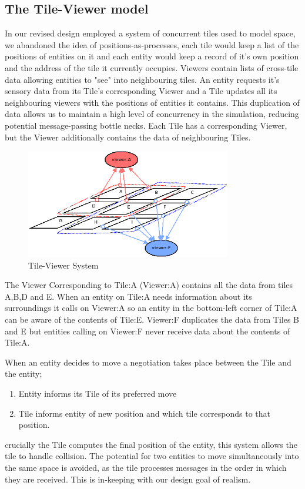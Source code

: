 \subsection{The Tile-Viewer model}
In our revised design employed a system of concurrent tiles used to model space, we abandoned the idea of positions-as-processes, each tile would keep a list of the positions of entities on it and each entity would keep a record of it's own position and the address of the tile it currently occupies. Viewers contain lists of cross-tile data allowing entities to "see" into neighbouring tiles. An entity requests it's sensory data from its Tile's corresponding Viewer and a Tile updates all its neighbouring viewers with the positions of entities it contains. This duplication of data allows us to maintain a high level of concurrency in the simulation, reducing potential message-passing bottle necks. Each Tile has a corresponding Viewer, but the Viewer additionally contains the data of neighbouring Tiles.
\begin{figure}[h]
  \centering
  \includegraphics[width=0.8\textwidth]{img/tile_to_viewer_map.png}
\caption{Tile-Viewer System}
    \label{fig:Tile-Viewer System}
\end{figure}
The Viewer Corresponding to Tile:A (Viewer:A) contains all the data from tiles A,B,D and E. When an entity on Tile:A needs information about its surroundings it calls on Viewer:A so an entity in the bottom-left corner of Tile:A can be aware of the contents of Tile:E. Viewer:F duplicates the data from Tiles B and E but entities calling on Viewer:F never receive data about the contents of Tile:A.

When an entity decides to move a negotiation takes place between the Tile and the entity;
\begin{enumerate}
\item{Entity informs its Tile of its preferred move}
\item{Tile informs entity of new position and which tile corresponds to that position.}
\end{enumerate}
crucially the Tile computes the final position of the entity, this system allows the tile to handle collision. The potential for two entities to move simultaneously into the same space is avoided, as the tile processes messages in the order in which they are received. This is in-keeping with our design goal of realism.

